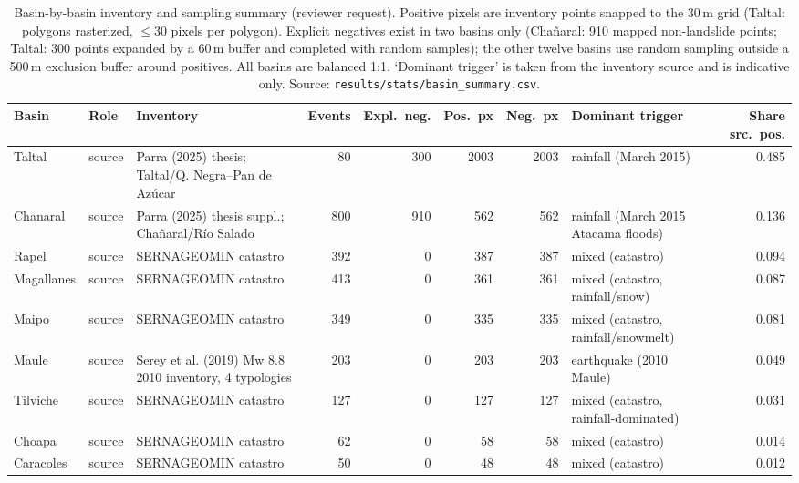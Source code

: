 \begin{table}[ht]
    \centering
    \caption{Basin-by-basin inventory and sampling summary (reviewer request). Positive pixels are inventory points snapped to the 30\,m grid (Taltal: polygons rasterized, $\leq 30$ pixels per polygon). Explicit negatives exist in two basins only (Cha\~naral: 910 mapped non-landslide points; Taltal: 300 points expanded by a 60\,m buffer and completed with random samples); the other twelve basins use random sampling outside a 500\,m exclusion buffer around positives. All basins are balanced 1:1. `Dominant trigger' is taken from the inventory source and is indicative only. Source: \texttt{results/stats/basin\_summary.csv}.}
    \label{tab:basin_summary}
    \scriptsize
    \begin{adjustbox}{max width=\textwidth}
    \begin{tabular}{llp{3.6cm}rrrrp{3.0cm}r}
        \toprule
        \textbf{Basin} & \textbf{Role} & \textbf{Inventory} & \textbf{Events} & \textbf{Expl.\ neg.} & \textbf{Pos.\ px} & \textbf{Neg.\ px} & \textbf{Dominant trigger} & \textbf{Share src.\ pos.} \\
        \midrule
        Taltal & source & Parra (2025) thesis; Taltal/Q. Negra–Pan de Azúcar & 80 & 300 & 2003 & 2003 & rainfall (March 2015) & 0.485 \\
        Chanaral & source & Parra (2025) thesis suppl.; Chañaral/Río Salado & 800 & 910 & 562 & 562 & rainfall (March 2015 Atacama floods) & 0.136 \\
        Rapel & source & SERNAGEOMIN catastro & 392 & 0 & 387 & 387 & mixed (catastro) & 0.094 \\
        Magallanes & source & SERNAGEOMIN catastro & 413 & 0 & 361 & 361 & mixed (catastro, rainfall/snow) & 0.087 \\
        Maipo & source & SERNAGEOMIN catastro & 349 & 0 & 335 & 335 & mixed (catastro, rainfall/snowmelt) & 0.081 \\
        Maule & source & Serey et al. (2019) Mw 8.8 2010 inventory, 4 typologies & 203 & 0 & 203 & 203 & earthquake (2010 Maule) & 0.049 \\
        Tilviche & source & SERNAGEOMIN catastro & 127 & 0 & 127 & 127 & mixed (catastro, rainfall-dominated) & 0.031 \\
        Choapa & source & SERNAGEOMIN catastro & 62 & 0 & 58 & 58 & mixed (catastro) & 0.014 \\
        Caracoles & source & SERNAGEOMIN catastro & 50 & 0 & 48 & 48 & mixed (catastro) & 0.012 \\

\end{tabular}
\end{adjustbox}
\end{table}

